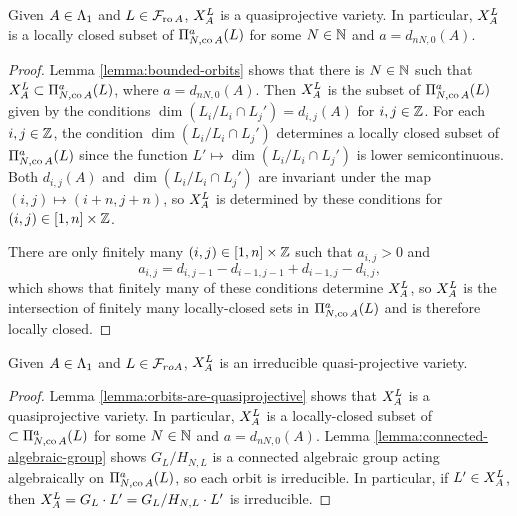 \documentclass[a4paper, 11pt]{report}
\begin{document}
\begin{lemma}\label{lemma:orbits-are-quasiprojective}
Given $A\in\matrices$ and $L\in\flags_{\ro{A}}$, $\xprod[L]{A}$ is a quasiprojective variety. In particular, $\xprod[L]{A}$ is a locally closed subset of $\Pi_{N,\co{A}}^a(L)$ for some $N\in\naturals$ and $a=d_{nN,0}(A)$.
\end{lemma}

\begin{proof}
Lemma \ref{lemma:bounded-orbits} shows that there is $N\in\naturals$ such that $\xprod[L]{A}\subset\Pi_{N,\co{A}}^a(L)$, where $a=d_{nN,0}(A)$. Then $\xprod[L]{A}$ is the subset of $\Pi_{N,\co{A}}^a(L)$ given by the conditions $\dim(L_i/{L_i\cap L_j'})=d_{i,j}(A)$ for $i,j\in\integers$. For each $i,j\in\integers$, the condition $\dim(L_i/{L_i\cap L_j'})$ determines a locally closed subset of $\Pi_{N,\co{A}}^a(L)$ since the function $L'\mapsto \dim(L_i/{L_i\cap L_j'})$ is lower semicontinuous. Both $d_{i,j}(A)$ and $\dim(L_i/{L_i\cap L_j'})$ are invariant under the map $(i,j)\mapsto (i+n,j+n)$, so $\xprod[L]{A}$ is determined by these conditions for $(i,j)\in [1,n]\times\integers$.

There are only finitely many $(i,j)\in[1,n]\times\integers$ such that $a_{i,j}>0$ and
\begin{equation*}
a_{i,j} = d_{i,j-1} - d_{i-1,j-1} + d_{i-1,j} - d_{i,j},
\end{equation*}
{\color{blue}which shows} that finitely many of these conditions determine $\xprod[L]{A}$, so $\xprod[L]{A}$ is the intersection of finitely many locally-closed sets in $\Pi_{N,\co{A}}^a(L)$ and is therefore locally closed.
\end{proof}

\begin{lemma}\label{lemma:orbits-are-irreducible}
Given $A\in\matrices$ and $L\in\flags_{ro{A}}$, $\xprod[L]{A}$ is an irreducible quasi-projective variety.
\end{lemma}

\begin{proof}
Lemma \ref{lemma:orbits-are-quasiprojective} shows that $\xprod[L]{A}$ is a quasiprojective variety. In particular, $\xprod[L]{A}$ is a locally-closed subset of $\subset\Pi_{N,\co{A}}^a(L)$ for some $N\in\naturals$ and $a=d_{nN,0}(A)$. Lemma \ref{lemma:connected-algebraic-group} shows $G_L/{H_{N,L}}$ is a connected algebraic group acting algebraically on $\Pi_{N,\co{A}}^a(L)$, so each orbit is irreducible. In particular, if $L'\in\xprod[L]{A}$, then $\xprod[L]{A}=G_L\cdot L'=G_L/{H_{N,L}}\cdot L'$ is irreducible.
\end{proof}
\end{document}

